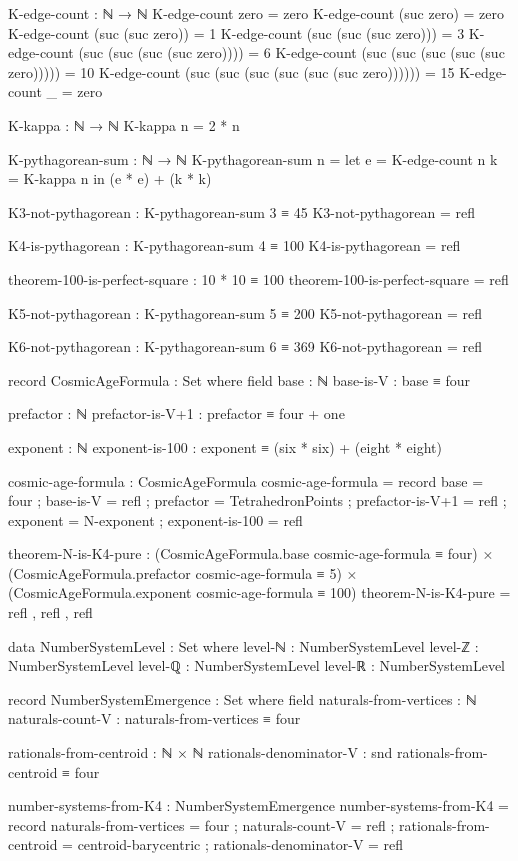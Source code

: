 \documentclass[11pt,a4paper]{book}
\begin{document}
\begin{code}
K-edge-count : ℕ → ℕ
K-edge-count zero = zero
K-edge-count (suc zero) = zero
K-edge-count (suc (suc zero)) = 1
K-edge-count (suc (suc (suc zero))) = 3
K-edge-count (suc (suc (suc (suc zero)))) = 6
K-edge-count (suc (suc (suc (suc (suc zero))))) = 10
K-edge-count (suc (suc (suc (suc (suc (suc zero)))))) = 15
K-edge-count _ = zero

K-kappa : ℕ → ℕ
K-kappa n = 2 * n

K-pythagorean-sum : ℕ → ℕ
K-pythagorean-sum n = let e = K-edge-count n
                          k = K-kappa n
                      in (e * e) + (k * k)

K3-not-pythagorean : K-pythagorean-sum 3 ≡ 45
K3-not-pythagorean = refl

K4-is-pythagorean : K-pythagorean-sum 4 ≡ 100
K4-is-pythagorean = refl

theorem-100-is-perfect-square : 10 * 10 ≡ 100
theorem-100-is-perfect-square = refl

K5-not-pythagorean : K-pythagorean-sum 5 ≡ 200
K5-not-pythagorean = refl

K6-not-pythagorean : K-pythagorean-sum 6 ≡ 369
K6-not-pythagorean = refl
\end{code}

\begin{code}
record CosmicAgeFormula : Set where
  field
    base : ℕ
    base-is-V : base ≡ four
    
    prefactor : ℕ
    prefactor-is-V+1 : prefactor ≡ four + one
    
    exponent : ℕ
    exponent-is-100 : exponent ≡ (six * six) + (eight * eight)

cosmic-age-formula : CosmicAgeFormula
cosmic-age-formula = record
  { base = four
  ; base-is-V = refl
  ; prefactor = TetrahedronPoints
  ; prefactor-is-V+1 = refl
  ; exponent = N-exponent
  ; exponent-is-100 = refl
  }

theorem-N-is-K4-pure : 
  (CosmicAgeFormula.base cosmic-age-formula ≡ four) × 
  (CosmicAgeFormula.prefactor cosmic-age-formula ≡ 5) × 
  (CosmicAgeFormula.exponent cosmic-age-formula ≡ 100)
theorem-N-is-K4-pure = refl , refl , refl
\end{code}

\begin{code}
data NumberSystemLevel : Set where
  level-ℕ : NumberSystemLevel
  level-ℤ : NumberSystemLevel
  level-ℚ : NumberSystemLevel
  level-ℝ : NumberSystemLevel

record NumberSystemEmergence : Set where
  field
    naturals-from-vertices : ℕ
    naturals-count-V : naturals-from-vertices ≡ four
    
    rationals-from-centroid : ℕ × ℕ
    rationals-denominator-V : snd rationals-from-centroid ≡ four

number-systems-from-K4 : NumberSystemEmergence
number-systems-from-K4 = record
  { naturals-from-vertices = four
  ; naturals-count-V = refl
  ; rationals-from-centroid = centroid-barycentric
  ; rationals-denominator-V = refl
  }
\end{code}
\end{document}
